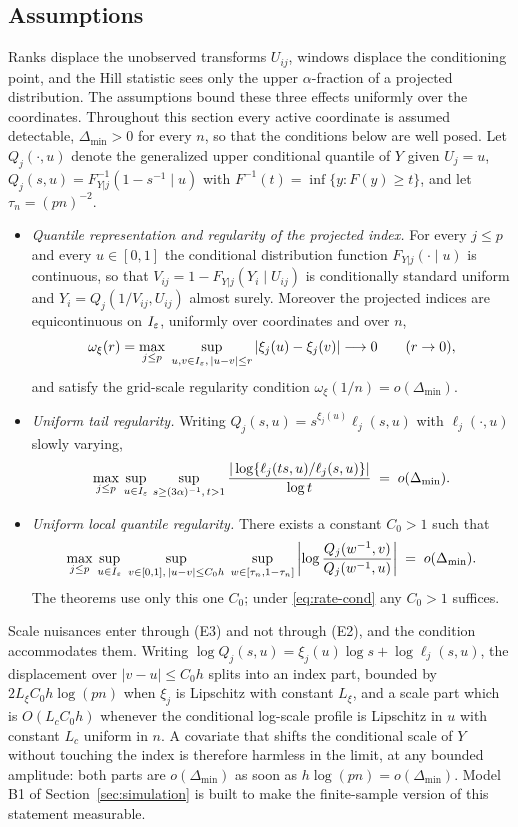 \subsection{Assumptions}

Ranks displace the unobserved transforms $U_{ij}$, windows displace the
conditioning point, and the Hill statistic sees only the upper
$\alpha$-fraction of a projected distribution. The assumptions bound these
three effects uniformly over the coordinates. Throughout this section
every active coordinate is assumed detectable, $\Delta_{\min}>0$ for
every $n$, so that the conditions below are well posed. Let
$Q_j(\cdot,u)$ denote the generalized upper conditional quantile of $Y$
given $U_j=u$, $Q_j(s,u)=F_{Y|j}^{-1}(1-s^{-1}\mid u)$ with
$F^{-1}(t)=\inf\{y:F(y)\ge t\}$, and let $\tau_n=(pn)^{-2}$.

\begin{itemize}
\item[(E1)] \emph{Quantile representation and regularity of the projected
index.} For every $j\le p$ and every $u\in[0,1]$ the conditional
distribution function $F_{Y|j}(\cdot\mid u)$ is continuous, so that
$V_{ij}=1-F_{Y|j}(Y_i\mid U_{ij})$ is conditionally standard uniform and
$Y_i=Q_j(1/V_{ij},U_{ij})$ almost surely. Moreover the projected indices
are equicontinuous on $I_\varepsilon$, uniformly over coordinates and over $n$,
\[
 \omega_\xi(r)=\max_{j\le p}\;
 \sup_{u,v\in I_\varepsilon,\,|u-v|\le r}|\xi_j(u)-\xi_j(v)|
 \longrightarrow0\qquad(r\to0),
\]
and satisfy the grid-scale regularity condition
$\omega_\xi(1/n)=o(\Delta_{\min})$.
\item[(E2)] \emph{Uniform tail regularity.} Writing
$Q_j(s,u)=s^{\xi_j(u)}\ell_j(s,u)$ with $\ell_j(\cdot,u)$ slowly varying,
\[
 \max_{j\le p}\,\sup_{u\in I_\varepsilon}\,
 \sup_{s\ge(3\alpha)^{-1},\,t>1}
 \frac{|\log\{\ell_j(ts,u)/\ell_j(s,u)\}|}{\log t}
 \;=\;o(\Delta_{\min}).
\]
\item[(E3)] \emph{Uniform local quantile regularity.} There exists a
constant $C_0>1$ such that
\[
 \max_{j\le p}\,
 \sup_{u\in I_\varepsilon}\;
 \sup_{v\in[0,1],\,|u-v|\le C_0h}\;
 \sup_{w\in[\tau_n,1-\tau_n]}
 \left|\log\frac{Q_j(w^{-1},v)}{Q_j(w^{-1},u)}\right|
 \;=\;o(\Delta_{\min}).
\]
The theorems use only this one $C_0$; under \eqref{eq:rate-cond} any
$C_0>1$ suffices.
\end{itemize}

Scale nuisances enter through (E3) and not through (E2), and the
condition accommodates them. Writing
$\log Q_j(s,u)=\xi_j(u)\log s+\log\ell_j(s,u)$, the displacement over
$|v-u|\le C_0h$ splits into an index part, bounded by
$2L_\xi C_0h\log(pn)$ when $\xi_j$ is Lipschitz with constant $L_\xi$,
and a scale part which is $O(L_cC_0h)$ whenever the conditional
log-scale profile is Lipschitz in $u$ with constant $L_c$ uniform in
$n$. A covariate that shifts the conditional scale of $Y$ without
touching the index is therefore harmless in the limit, at any bounded
amplitude: both parts are $o(\Delta_{\min})$ as soon as
$h\log(pn)=o(\Delta_{\min})$. Model B1 of
Section~\ref{sec:simulation} is built to make the finite-sample
version of this statement measurable.

